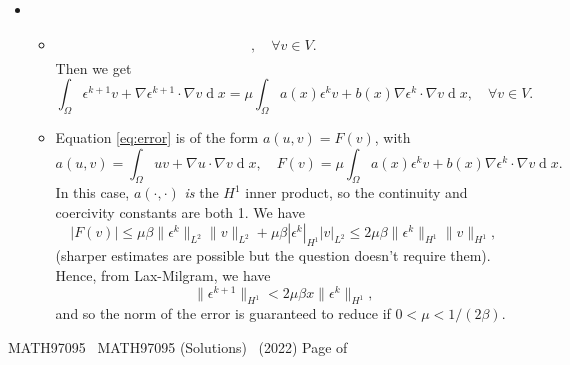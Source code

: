 \documentclass[11pt]{article}
\newcommand{\coursenum}{MATH97095} %
\newcommand{\coursename}{MATH97095 (Solutions)}
\renewcommand{\pagetotal}{\pageref{pagetot}}     %
\newcommand{\examyear}{2022}%
\newcommand{\marb}[1]{\marginpar{~~\fbox{\,\mathstrut #1\,}}}
\newcommand{\marbup}[1]{\vspace*{-4mm} \par \marb{#1}}
\newcommand{\unseen}{\marbup{{\small unseen $\Downarrow$}}}
\DeclareMathOperator{\diff}{d}
\newcounter{count_marks}
\newcounter{count_amarks}
\newcounter{count_bmarks}
\newcounter{count_cmarks}
\newcounter{count_dmarks}
\newcounter{count_mmarks} %
\newcommand{\bmarks}[1]{\addtocounter{count_marks}{#1} \addtocounter{count_bmarks}{#1}\marginpar{~~\fbox{\,\mathstrut #1, B}}}
\newcommand{\dmarks}[1]{\addtocounter{count_marks}{#1} \addtocounter{count_dmarks}{#1}\marginpar{~~\fbox{\,\mathstrut #1, D}}}
\newenvironment{Question}[1] 
 {\begin{itemize} \item[\large #1.~~]}{\end{itemize}\vfill
}
\newenvironment{Part}[1] 
 {\begin{itemize} \item[(#1)~~]}{\end{itemize}}
\newcommand{\EndPage}{\vfill \coursenum ~ \coursename ~
 (\examyear) \hfill Page \thepage\/ of \pagetotal \newpage}
\begin{document}
\begin{Question}{4}
\begin{Part}{b}
\begin{align}
\begin{split}
            , \quad
            \forall v \in V.
            \end{split}
          \end{align}
          Then we get
          \begin{equation}
    \int_\Omega \epsilon^{k+1}v + \nabla \epsilon^{k+1} \cdot \nabla v \diff x = 
\mu
\int_\Omega a(x) \epsilon^kv + b(x)\nabla \epsilon^k \cdot \nabla v \diff x
    , \quad
\forall v \in V.
\label{eq:error}
          \end{equation}
  \bmarks{6}
\end{Part}
  \begin{Part}{c}\unseen
    Equation \eqref{eq:error} is of the form $a(u,v) = F(v)$,
    with
    \begin{equation}
      a(u,v) = \int_\Omega uv + \nabla u\cdot\nabla v \diff x,
      \quad F(v) = \mu\int_\Omega a(x)\epsilon^k v + b(x)\nabla\epsilon^k
      \cdot \nabla v \diff x.
    \end{equation}
    In this case, $a(\cdot,\cdot)$ \emph{is} the $H^1$ inner product,
    so the continuity and coercivity constants are both 1.
    We have
    \begin{equation}
      |F(v)| \leq \mu\beta \|\epsilon^k\|_{L^2}\|v\|_{L^2}
      + \mu\beta |\epsilon^k|_{H^1}|v|_{L^2}
      \leq 2\mu\beta\|\epsilon^k\|_{H^1}\|v\|_{H^1},
    \end{equation}
    (sharper estimates are possible but the question doesn't require them).
    Hence, from Lax-Milgram, we have
    \begin{equation}
      \|\epsilon^{k+1}\|_{H^1} < 2\mu\beta x\|\epsilon^k\|_{H^1},
    \end{equation}
    and so the norm of the error is guaranteed to reduce if $0<\mu<1/(2\beta)$.
  \dmarks{8}
\end{Part}
\end{Question}
	


\EndPage
\end{document}

